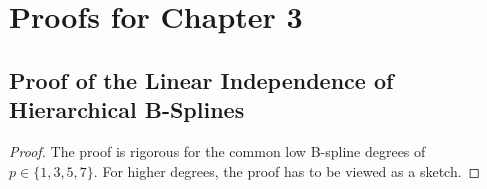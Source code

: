 \section{Proofs for Chapter 3}

\subsection{Proof of the Linear Independence of Hierarchical B-Splines}
\label{sec:proofHierBSplineLinearlyIndependent}

\propHierBSplineLinearlyIndependent*

\begin{proof}
  The proof is rigorous for the common low B-spline degrees of
  $p \in \{1, 3, 5, 7\}$.
  For higher degrees, the proof has to be viewed as a sketch.
  

\end{proof}
